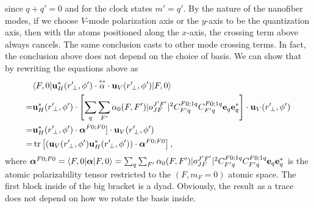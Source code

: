 since $q+q' = 0$ and for the clock states $m' = q'$. By the nature of the nanofiber modes, if we choose 
$V$-mode polarization axis or the $y$-axis to be the quantization axis, then with the atoms positioned 
along the $x$-axis, the crossing term above always cancels. The same conclusion casts to other mode crossing 
terms. In fact, the conclusion above does not depend on the choice of basis. We can show that by 
rewriting the equations above as
\begin{align}
&\bra{F,0} \mathbf{u}^*_H(r^\prime\!_\perp, \phi') \cdot \tensor{\alpha} \cdot 
	\mathbf{u}_{V}(r^\prime\!_\perp, \phi') \ket{F,0}\nonumber\\
=& \mathbf{u}^*_H(r^\prime\!_\perp, 
 \phi')\cdot \left[  \sum_{q} \sum_{F'}\alpha_0(F,F') 
   |o^{J'F'}_{JF} |^2 C^{F 	0;1q}_{F' q} C^{F 0;1q}_{F' q}
     	  \mathbf{e}_q \mathbf{e}^*_{q}  \right]\cdot \mathbf{u}_V(r^\prime\!_\perp, \phi') \\
=& \mathbf{u}^*_H(r^\prime\!_\perp,  \phi')\cdot \boldsymbol{\alpha}^{F0;F0}]\cdot 
\mathbf{u}_V(r^\prime\!_\perp, \phi') \\
=& \tr\left[ \left(  \mathbf{u}_V(r^\prime\!_\perp, \phi')  \mathbf{u}^*_H(r^\prime\!_\perp,  \phi')\right)
\cdot  \boldsymbol{\alpha}^{F0;F0} \right],
\end{align}
where $  \boldsymbol{\alpha}^{F0;F0} = \langle{F,0}\rvert\boldsymbol{\alpha}\lvert{F,0}\rangle = \sum_{q} 
\sum_{F'}\alpha_0(F,F') 
   |o^{J'F'}_{JF} |^2 C^{F 	0;1q}_{F' q} C^{F 0;1q}_{F' q}
     	  \mathbf{e}_q \mathbf{e}^*_{q} $ is the atomic 
polarizability tensor restricted to the $ (F,m_F=0) $ atomic space. The first block inside of the big bracket 
is a dyad. Obviously, the result as a trace does not depend on how we rotate the basis inside. 
 

